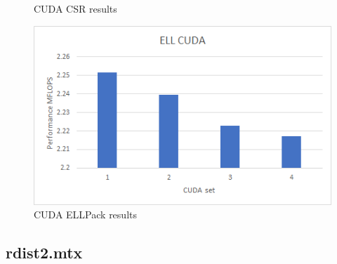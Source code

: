 \documentclass{scrreprt}
\begin{document}
\begin{figure}[ht]
\begin{minipage}[b]{0.5\linewidth}
    \caption{CUDA CSR results} 
    \vspace{4ex}
  \end{minipage}%
  \begin{minipage}[b]{0.5\linewidth}
    \centering
    \includegraphics[width=.9\linewidth]{mcfeELLCUDA.png} 
    \caption{CUDA ELLPack  results} 
    \vspace{4ex}
  \end{minipage} 
\end{figure}
\FloatBarrier






\subsection{rdist2.mtx}
\end{document}
